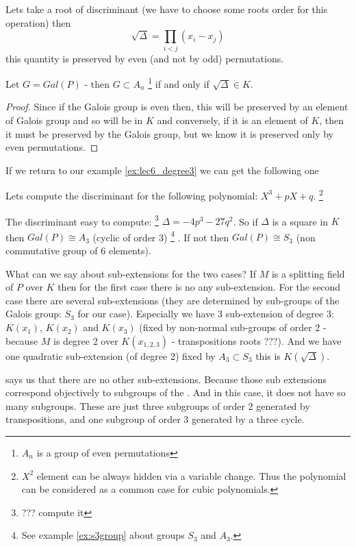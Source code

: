 Lets take a root of discriminant (we have to choose some roots order
for this operation) then
\[
\sqrt{\Delta} = \prod_{i < j} \left(x_i - x_j\right)
\]
this quantity is preserved by even (and not by odd) permutations.

\begin{proposition}
  Let $G = Gal\left(P\right)$ -  then $G
  \subset A_n$
  \footnote {
    $A_n$ is a group of even permutations
  }
  if and only if $\sqrt{\Delta} \in K$.
  \begin{proof}
    Since if the Galois group is even then, this will be preserved by
    an element of Galois group and so will be in $K$ and conversely, if
    it is an element of $K$, then it must be preserved by the Galois
    group, but we know it is preserved only by even permutations. 
  \end{proof}
  \label{prop:lec6_1}
\end{proposition}

If we return to our example \ref{ex:lec6_degree3} we can get the
following one
\begin{example}
  Lets compute the discriminant for the following polynomial:
  $X^3 + p X + q$.
  \footnote {
    $X^2$ element can be always hidden via a variable change. Thus the
    polynomial can be considered as a common case for cubic polynomials.
  }

  The discriminant easy to compute:
  \footnote{
    ??? compute it
  }
  \(
  \Delta = -4 p^3 - 27 q^2
  \).
  So if $\Delta$ is a square in $K$ then $Gal\left(P\right) \cong A_3$
  (cyclic of order 3)
  \footnote{
    See example \ref{ex:s3group} about groups $S_3$ and
     $A_3$.
  }
  . If not then $Gal\left(P\right) \cong S_3$ (non
  commutative group of 6 elements).

  What can we say about sub-extensions for the two cases? If $M$ is a
  splitting field of $P$ over $K$ then for the first case there is no
  any sub-extension. For the second case there are several
  sub-extensions (they are determined by sub-groups of the Galois
  group: $S_3$ for our case). Especially we have 3 sub-extension of
  degree 3: $K\left(x_1\right)$, $K\left(x_2\right)$ and
  $K\left(x_3\right)$ (fixed by non-normal sub-groups of order 2 -
  because $M$ is degree 2 over $K\left(x_{1,2,3}\right)$ -
  transpositions roots ???). And we have one quadratic sub-extension
  (of degree 2) fixed by $A_3 \subset S_3$ this is
  $K\left(\sqrt{\Delta}\right)$.

   says us that there are no other
  sub-extensions. Because those sub extensions correspond objectively
  to subgroups of the . And in this case, it
  does not have so many subgroups. These are just three subgroups of order 2
  generated by transpositions, and one subgroup of order 3 generated
  by a three cycle.  
  \label{ex:lec6_discriminant3degree}
\end{example}


